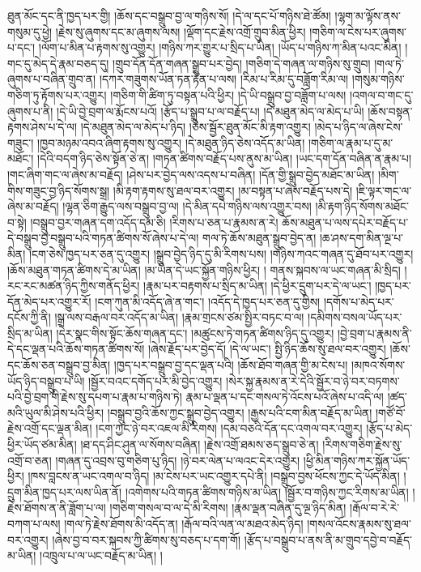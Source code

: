 ཐུན་མོང་དང་ནི་ཁྱད་པར་གྱི། །ཆོས་དང་བསྒྲུབ་བྱ་ལ་གཉིས་སོ། །དེ་ལ་དང་པོ་གཉིས་ཐེ་ཚོམ། །ལྷག་མ་ལྟོས་ནས་གསུམ་དུ་ཕྱེ། །རྗེས་སུ་ཞུགས་དང་མ་ཞུགས་ལས། །ལྡོག་དང་རྗེས་འགྲོ་གྲུབ་མིན་ཕྱིར། །གཅིག་ལ་ངེས་པར་ཞུགས་པ་དང་། །ལོག་པ་མིན་པ་རྟགས་སུ་འགྱུར། །གཉིས་ཀར་གྱུར་པ་སྲིད་པ་ཡིན། །ཡོད་པ་གཉིས་ཀ་མིན་པའང་མིན། །གང་དུ་མེད་དེ་རྣམ་བཅད་དུ། །གྲུབ་དོན་དོན་གཞན་སྒྲུབ་པར་བྱེད། །གཅིག་དེ་གཞན་ལ་གཉིས་སུ་གྲུབ། །གལ་ཏེ་ཞུགས་པ་བཞིན་གྲུབ་ན། །དཀར་གཟུགས་ཡོན་ཏན་རྟེན་པ་ལས། །རིམ་པ་རིམ་དུ་བཟློག་རིམ་ལ། །གསུམ་གཉིས་གཅིག་ཏུ་རྟོགས་པར་འགྱུར། །གཅིག་གི་ཚིག་ཏུ་བསྟན་པའི་ཕྱིར། །དེ་ཡི་བསྒྲུབ་བྱ་བཟློག་པ་ལས། །འགལ་བ་གང་དུ་ཞུགས་པ་ནི། །དེ་ཡི་བྱེ་བྲག་ལ་རྨོངས་པའོ། །རྩོད་པ་སྒྲུབ་པ་ལ་བརྗོད་པ། །དེ་མཐུན་མེད་ལ་མེད་པ་ཡི། །ཆོས་བསྟན་རྟགས་ཤེས་པ་དེ་ལ། །དེ་མཐུན་མེད་ལ་མེད་པ་ཉིད། །ཅེས་སྦྱོར་ཐུན་མོང་མི་རྟག་འགྱུར། །མེད་པ་ཉིད་ལ་ཞེས་ངེས་གཟུང་། །ཁྱབ་མཉམ་འབའ་ཞིག་རྟགས་སུ་འགྱུར། །དེ་མཐུན་ཉིད་ཅེས་འདོད་མ་ཡིན། །གཅིག་ལ་རྣམ་པ་དུ་མ་མཐོང་། །དེའི་བདག་ཉིད་ཅེས་སྟོན་ཅེ་ན། །གཏན་ཚིགས་བརྗོད་པས་ནུས་མ་ཡིན། །ཡང་དག་དོན་བཞིན་ན་རྣམ་པ། །གང་ཞིག་གང་ལ་ཞེས་མ་བརྗོད། །ཤེས་པར་བྱེད་ལས་འདས་པ་བཞིན། །དོན་གྱི་སྒྲུབ་བྱེད་མཐོང་མ་ཡིན། །མིག་གིས་གཟུང་བྱ་ཉིད་སོགས་སྒྲ། །མི་རྟག་རྟགས་སུ་ཐལ་བར་འགྱུར། །མ་བསྟན་པ་ཞེས་བརྗོད་པས་དེ། །ཇི་ལྟར་གང་ལ་ཞེས་མ་བརྗོད། །ལྷན་ཅིག་རྒྱུད་ལས་བསྒྲུབ་བྱ་ལ། །དེ་མིན་དཔེ་གཉིས་ལས་འགྱུར་བས། །མི་རྟག་ཉིད་སོགས་མཐོང་བ་སྟེ། །བསྒྲུབ་བྱར་གཞན་དག་འདོད་དམ་ཅི། །རིགས་པ་ཅན་པ་རྣམས་ན་རེ། ཆོས་མཐུན་པ་ལས་དཔེར་བརྗོད་པ་དེ་བསྒྲུབ་བྱ་བསྒྲུབ་པའི་གཏན་ཚིགས་སོ་ཞེས་པ་དེ་ལ། གལ་ཏེ་ཆོས་མཐུན་སྒྲུབ་བྱེད་ན། །ཆ་ཤས་དག་མིན་ལྔ་པ་མིན། །ངག་ཅེས་ཁྱད་པར་ཅན་དུ་འགྱུར། །སྒྲུབ་བྱེད་ཉིད་དུ་མི་རིགས་པས། །གཉིས་ཀའང་གཞན་དུ་ཐོབ་པར་འགྱུར། །ཆོས་མཐུན་གཏན་ཚིགས་དེ་མ་ཡིན། །མ་ཡིན་དེ་ཡང་སྐྱོན་གཉིས་ཕྱིར། །
གནས་སྐབས་ལ་ཡང་གཞན་མི་སྲིད། །རང་རང་མཚན་ཉིད་ཀྱིས་གནོད་ཕྱིར། །རྣམ་པར་བརྟགས་པ་སྲིད་མ་ཡིན། །དེ་ཕྱིར་དྲུག་པར་དེ་ལ་ཡང་། །ཁྱད་པར་དོན་མེད་པར་འགྱུར་རོ། །ངག་ཀུན་མི་འདོད་ཞེ་ན་གང་། །འདོད་དེ་ཁྱད་པར་ཅན་དུ་གྱིས། །དགོས་པ་མེད་པར་དངོས་ཀྱི་ནི། །སྒྲ་ལས་བརྒལ་བར་འདོད་མ་ཡིན། །རྣམ་གྲངས་ཙམ་སྤྱིར་བཏང་བ་ལ། །དམིགས་བསལ་ཡོད་པར་སྲིད་མ་ཡིན། །དེར་སྣང་གིས་སྟོང་ཆོས་གཞན་དང་། །མཚུངས་ཏེ་གཏན་ཚིགས་ཉིད་དུ་འགྱུར། །བྱེ་བྲག་པ་རྣམས་ནི་དེ་དང་ལྡན་པའི་ཆོས་གཏན་ཚིགས་སོ། །ཞེས་རྗོད་པར་བྱེད་དོ། །དེ་ལ་ཡང་། སྤྱི་ཉིད་ཆོས་སུ་ཐལ་བར་འགྱུར། །ཆོས་དང་ཆོས་ཅན་བསྒྲུབ་བྱ་མིན། །ཁྱད་པར་བསྒྲུབ་བྱ་དང་ལྡན་པའི། །ཆོས་ཐོབ་གཞན་གྱི་མ་ངེས་པ། །མཁའ་སོགས་ཡོད་ཉིད་བསྒྲུབ་པ་ཡི། །སྦྱོར་བའང་དགོད་པར་མི་བྱེད་འགྱུར། །སེར་སྐྱ་རྣམས་ན་རེ་དེའི་སྦྱོར་བ་ཉེ་བར་བཏགས་པའི་བྱེ་བྲག་གི་རྗེས་སུ་དཔག་པ་རྣམ་པ་གཉིས་ཏེ། རྣམ་པ་ལྡན་པ་དང་གསལ་ཏེ་འོངས་པའོ་ཞེས་པ་འདི་ལ། །ཚད་མའི་ཡུལ་མི་ཤེས་པའི་ཕྱིར། །བསྒྲུབ་བྱའི་ཆོས་ཀྱང་སྒྲུབ་བྱེད་འགྱུར། །རྒྱས་པའི་ངག་མིན་བརྗོད་མ་ཡིན། །གཙོ་བོ་རྗེས་འགྲོ་དང་ལྡན་མིན། །ངག་ཀྱང་ཉེ་བར་འཇལ་མི་རིགས། །དམ་བཅའི་དོན་དང་འགལ་བར་འགྱུར། །རྩོད་པ་མེད་ཕྱིར་ཡོད་ཙམ་མིན། །ཐ་དད་ཤིང་ཤུན་ལ་སོགས་བཞིན། །རྗེས་འགྲོ་ཐམས་ཅད་སྒྲུབ་ཅེ་ན། །རིགས་གཅིག་རྗེས་སུ་འགྲོ་བ་ཅན། །གཞན་དུ་འབྲས་བུ་གཅིག་པུ་ཉིད། །ཉེ་བར་ལེན་པ་ལའང་དེར་འགྱུར། །ཕྱི་མིན་གཉིས་ཀར་སྐྱོན་ཡོད་ཕྱིར། །ཁས་བླངས་ན་ཡང་འགལ་བ་ཉིད། །མ་ངེས་པར་ཡང་འགྱུར་དཔེ་ནི། །བསྒྲུབ་བྱས་ཕོངས་ཀྱང་དེ་ཡོད་མིན། །དྲུག་མིན་ཁྱད་པར་ལས་ཡིན་ནོ། །འགེགས་པའི་གཏན་ཚིགས་གཉིས་མ་ཡིན། །སྦྱོར་བ་གཉིས་ཀྱང་རིགས་མ་ཡིན། །རྗེས་ཐོགས་ན་ནི་ཟློག་པ་ལ། །གཅིག་གསལ་བ་ལ་དེ་མི་རིགས། །རྣམ་ལྡན་བཞིན་དུ་ལྔ་ཉིད་མིན། །རྒོལ་བ་རེ་རེ་བཀག་པ་ལས། །གལ་ཏེ་རྗེས་ཐོགས་མི་འདོད་ན། །རྒོལ་བའི་ལན་ལ་མཐའ་མེད་ཉིད། །གསལ་འོངས་རྣམས་སུ་ཐལ་བར་འགྱུར། །ཞེས་བྱ་བ་བར་སྐབས་ཀྱི་ཚིགས་སུ་བཅད་པ་དག་གོ། །རྩོད་པ་བསྒྲུབ་པ་ནས་ནི་མ་གྲུབ་དབྱེ་བ་བརྗོད་མ་ཡིན། །འཁྲུལ་པ་ལ་ཡང་བརྗོད་མ་ཡིན། །
